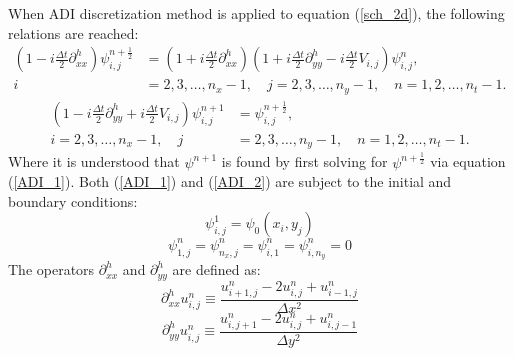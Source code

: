 \documentclass[10pt]{article}
\begin{document}
When ADI discretization method is applied to equation (\ref{sch_2d}), the following relations are 
reached:
\begin{align}\label{ADI_1}
\left( 1 - i \frac{\Delta t}{2} \partial_{xx}^h \right) \psi_{i,j}^{n+\frac{1}{2}} &=
\left( 1 + i \frac{\Delta t}{2} \partial_{xx}^h \right)
\left( 1 + i \frac{\Delta t}{2} \partial_{yy}^h - i \frac{\Delta t}{2} V_{i,j} \right) \psi_{i,j}^n,
\nonumber \\ i &= 2,3,\ldots,n_x-1, \quad j = 2,3,\ldots,n_y-1, \quad n = 1,2,\ldots,n_t-1.
\end{align}
\begin{align}\label{ADI_2}
\left( 1 - i \frac{\Delta t}{2} \partial_{yy}^h + i \frac{\Delta t}{2} V_{i,j} \right) 
\psi_{i,j}^{n+1} &= \psi_{i,j}^{n+\frac{1}{2}},
\nonumber \\ i = 2,3,\ldots,n_x-1, \quad j &= 2,3,\ldots,n_y-1, \quad n = 1,2,\ldots,n_t-1.
\end{align}
Where it is understood that $\psi^{n+1}$ is found by first solving for $\psi^{n+\frac{1}{2}}$ via 
equation (\ref{ADI_1}). Both (\ref{ADI_1}) and (\ref{ADI_2}) are subject to the initial and 
boundary conditions:
$$\psi_{i,j}^1 = \psi_0 (x_i, y_j)$$
$$\psi_{1,j}^n = \psi_{n_x,j}^n = \psi_{i,1}^n = \psi_{i,n_y}^n = 0$$
The operators $\partial_{xx}^h$ and $\partial_{yy}^h$ are defined as:
$$\partial_{xx}^h u_{i,j}^n \equiv \frac{u_{i+1,j}^n - 2u_{i,j}^n + u_{i-1,j}^n}{\Delta x^2}$$
$$\partial_{yy}^h u_{i,j}^n \equiv \frac{u_{i,j+1}^n - 2u_{i,j}^n + u_{i,j-1}^n}{\Delta y^2}$$
\end{document}
